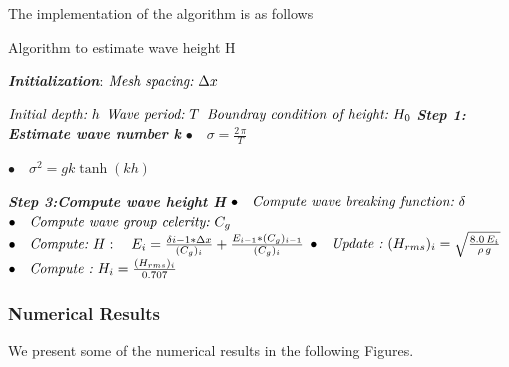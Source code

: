 The implementation of the algorithm is as follows
\begin{algorithm}
\caption{Algorithm to estimate wave height H}\label{euclid}
\begin{algorithmic}[1]
\Procedure{}{}
\BState \emph{\textit{\textbf{Initialization}}}:
\State $\textit{Mesh spacing:\,\,} \Delta x$

\State $\textit{Initial depth:\,\,} h$
\State $\textit{Wave period:\,\,} T$
\State $\textit{Boundray condition of height:\,\,}H_{0}$
\BState \emph{\textbf{Step 1: Estimate wave number k}}
\State $\bullet \quad\sigma=\frac{2\, \pi}{T}$

\State $\bullet \quad\sigma^2=gk\tanh(kh)$

%
%

\BState \emph{\textbf{Step 3:Compute wave height H}}
\State $\bullet \quad\textit{Compute wave breaking function:\,\,} \delta$
\State $\bullet \quad\textit{Compute wave group celerity:\,\,} C_g$
\State $\bullet \quad\textit{Compute:\,\,} H:\quad E_{i}=\frac{\delta{i-1}*\Delta x}{(C_g)_{i}}+\frac{E_{i-1}*(C_g)_{i-1}}{(C_g)_{i}}$
\State $\bullet \quad\textit{Update :\,\,} (H_{rms})_{i}=\sqrt{\frac{8.0\,E_{i}}{\rho\, g}}$
\State $\bullet \quad\textit{Compute :\,\,} H_{i}=\frac{(H_{rms})_{i}}{0.707}$
\EndProcedure
\end{algorithmic}
\end{algorithm} 


\subsubsection{Numerical Results}
We present some of the numerical results in the following Figures.


